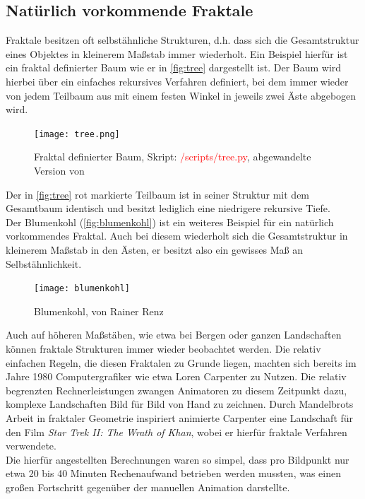 \documentclass[a4paper,12pt,onesided]{report}
\begin{document}
\subsection{Natürlich vorkommende Fraktale}
\label{sec:natfrac}
Fraktale besitzen oft selbstähnliche Strukturen, d.h. dass sich die Gesamtstruktur eines Objektes in kleinerem Maßstab immer wiederholt. Ein Beispiel hierfür ist ein fraktal definierter Baum wie er in \autoref{fig:tree} dargestellt ist. Der Baum wird hierbei über ein einfaches rekursives Verfahren definiert, bei dem immer wieder von jedem Teilbaum aus mit einem festen Winkel in jeweils zwei Äste abgebogen wird.

\begin{figure}[H]
	\centering
	\texttt{[image: tree.png]}
	\caption{Fraktal definierter Baum, Skript: \textcolor{red}{/scripts/tree.py}, abgewandelte Version von \cite{soTree}}
	\label{fig:tree}
\end{figure}

Der in \autoref{fig:tree} rot markierte Teilbaum ist in seiner Struktur mit dem Gesamtbaum identisch und besitzt lediglich eine niedrigere rekursive Tiefe.\\
Der Blumenkohl (\autoref{fig:blumenkohl}) ist ein weiteres Beispiel für ein natürlich vorkommendes Fraktal. 
Auch bei diesem wiederholt sich die Gesamtstruktur in kleinerem Maßstab in den Ästen, er besitzt also ein gewisses Maß an Selbstähnlichkeit.

\begin{figure}[H]
	\centering
	\texttt{[image: blumenkohl]}
	\caption{Blumenkohl, von Rainer Renz}
	\label{fig:blumenkohl}
\end{figure}

Auch auf höheren Maßstäben, wie etwa bei Bergen oder ganzen Landschaften können fraktale Strukturen immer wieder beobachtet werden. 
Die relativ einfachen Regeln, die diesen Fraktalen zu Grunde liegen, machten sich bereits im Jahre 1980 Computergrafiker wie etwa Loren Carpenter zu Nutzen.
Die relativ begrenzten Rechnerleistungen zwangen Animatoren zu diesem Zeitpunkt dazu, komplexe Landschaften Bild für Bild von Hand zu zeichnen. Durch Mandelbrots Arbeit in fraktaler Geometrie inspiriert animierte Carpenter eine Landschaft für den Film \textit{Star Trek II: The Wrath of Khan}, wobei er hierfür fraktale Verfahren verwendete. \cite{startrekFractals}\\
Die hierfür angestellten Berechnungen waren so simpel, dass pro Bildpunkt nur etwa 20 bis 40 Minuten Rechenaufwand betrieben werden mussten, was einen großen Fortschritt gegenüber der manuellen Animation darstellte. \cite{carpenterVolLibre}\\
\end{document}
